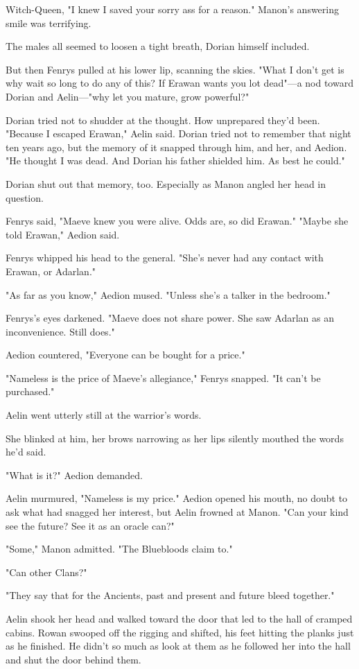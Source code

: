 Witch-Queen, "I knew I saved your sorry ass for a reason." Manon's answering smile was terrifying.

The males all seemed to loosen a tight breath, Dorian himself included.

But then Fenrys pulled at his lower lip, scanning the skies. "What I don't get is why wait so long to do any of this? If Erawan wants you lot dead"---a nod toward Dorian and Aelin---"why let you mature, grow powerful?"

Dorian tried not to shudder at the thought. How unprepared they'd been. "Because I escaped Erawan," Aelin said. Dorian tried not to remember that night ten years ago, but the memory of it snapped through him, and her, and Aedion. "He thought I was dead. And Dorian  his father shielded him. As best he could."

Dorian shut out that memory, too. Especially as Manon angled her head in question.

Fenrys said, "Maeve knew you were alive. Odds are, so did Erawan." "Maybe she told Erawan," Aedion said.

Fenrys whipped his head to the general. "She's never had any contact with Erawan, or Adarlan."

"As far as you know," Aedion mused. "Unless she's a talker in the bedroom."

Fenrys's eyes darkened. "Maeve does not share power. She saw Adarlan as an inconvenience. Still does."

Aedion countered, "Everyone can be bought for a price."

"Nameless is the price of Maeve's allegiance," Fenrys snapped. "It can't be purchased."

Aelin went utterly still at the warrior's words.

She blinked at him, her brows narrowing as her lips silently mouthed the words he'd said.

"What is it?" Aedion demanded.

Aelin murmured, "Nameless is my price." Aedion opened his mouth, no doubt to ask what had snagged her interest, but Aelin frowned at Manon. "Can your kind see the future? See it as an oracle can?"

"Some," Manon admitted. "The Bluebloods claim to."

"Can other Clans?"

"They say that for the Ancients, past and present and future bleed together."

Aelin shook her head and walked toward the door that led to the hall of cramped cabins. Rowan swooped off the rigging and shifted, his feet hitting the planks just as he finished. He didn't so much as look at them as he followed her into the hall and shut the door behind them.

